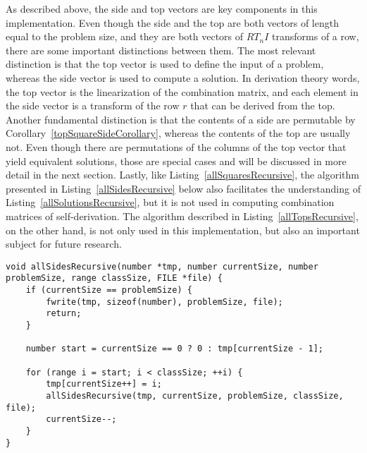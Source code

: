 As described above, the side and top vectors are key components in this implementation. Even though the side and the top are both vectors of length equal to the problem size, and they are both vectors of $RT_nI$ transforms of a row, there are some important distinctions between them. The most relevant distinction is that the top vector is used to define the input of a problem, whereas the side vector is used to compute a solution. In derivation theory words, the top vector is the linearization of the combination matrix, and each element in the side vector is a transform of the row $r$ that can be derived from the top. Another fundamental distinction is that the contents of a side are permutable by Corollary~\ref{topSquareSideCorollary}, whereas the contents of the top are usually not. Even though there are permutations of the columns of the top vector that yield equivalent solutions, those are special cases and will be discussed in more detail in the next section. Lastly, like Listing~\ref{allSquaresRecursive}, the algorithm presented in Listing~\ref{allSidesRecursive} below also facilitates the understanding of Listing~\ref{allSolutionsRecursive}, but it is not used in computing combination matrices of self-derivation. The algorithm described in Listing~\ref{allTopsRecursive}, on the other hand, is not only used in this implementation, but also an important subject for future research.

\begin{lstlisting}[caption={Recursively computing all side vectors of a certain size.},label={allSidesRecursive}]
void allSidesRecursive(number *tmp, number currentSize, number problemSize, range classSize, FILE *file) {
    if (currentSize == problemSize) {
        fwrite(tmp, sizeof(number), problemSize, file);
        return;
    }

    number start = currentSize == 0 ? 0 : tmp[currentSize - 1];

    for (range i = start; i < classSize; ++i) {
        tmp[currentSize++] = i;
        allSidesRecursive(tmp, currentSize, problemSize, classSize, file);
        currentSize--;
    }
}
\end{lstlisting}

